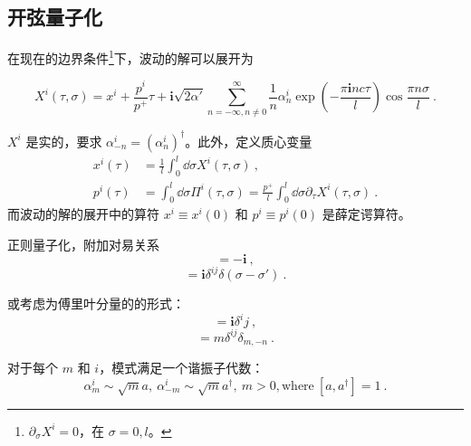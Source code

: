 


\subsection{开弦量子化}
在现在的边界条件\footnote{$\partial_\sigma X^i = 0$，在 $\sigma = 0, l$。}下，波动的解可以展开为 

\begin{equation}
	X^i(\tau, \sigma) = x^i + \frac{p^i}{p^+} \tau + 
    \mathbf{i} \sqrt{2 \alpha '} \sum_{n = -\infty, n \neq 0}^{\infty} \frac{1}{n} \alpha_n^i \exp\left(-\frac{\pi \mathbf{i} nc\tau}{l}\right) \cos \frac{\pi n \sigma}{l} ~.
\end{equation}

$X^i$ 是实的，要求 $\alpha_{-n}^i = (\alpha_n^i)^\dagger$。此外，定义质心变量
\begin{equation}
	\begin{aligned}
		x^i(\tau) &= \frac{1}{l} \int_0^l \dd \sigma X^i(\tau, \sigma)~, \\
		p^i(\tau) &= \int_0^l \dd \sigma \Pi^i(\tau, \sigma) = \frac{p^+}{l} \int_0^l \dd \sigma \partial_\tau X^i(\tau, \sigma) ~.
	\end{aligned}
\end{equation}
而波动的解的展开中的算符 $x^i \equiv x^i(0)$ 和 $p^i \equiv p^i(0)$ 是薛定谔算符。

正则量子化，附加对易关系
\begin{equation}
	[x^-, p^+] = -\mathbf{i} ~,
\end{equation}
\begin{equation}
	[X^i(\sigma), \Pi^j(\sigma')] = \mathbf{i} \delta^{ij} \delta(\sigma - \sigma') ~.
\end{equation}

或考虑为傅里叶分量的的形式：
\begin{equation}
	[x^i, p^j] = \mathbf{i} \delta^ij ~,
\end{equation}
\begin{equation}
	[\alpha_m^i, \alpha_n^j] = m \delta^{ij} \delta_{m, -n} ~.
\end{equation}

对于每个 $m$ 和 $i$，模式满足一个谐振子代数：
\begin{equation}
	\alpha_m^i \sim \sqrt m a, ~ \alpha_{-m}^i \sim \sqrt{m} a^\dagger, ~ m > 0, \text{where} ~[a, a^\dagger] = 1 ~.
\end{equation}


